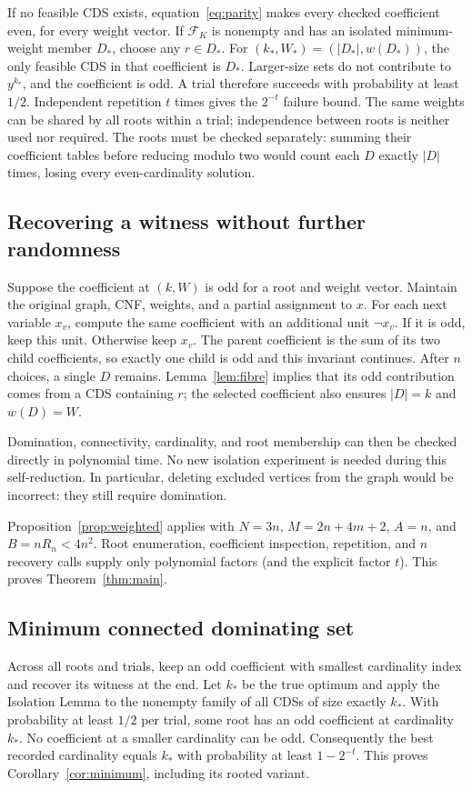 \documentclass[11pt]{article}
\theoremstyle{remark}\newtheorem{remark}[theorem]{Remark}
\begin{document}
If no feasible CDS exists, equation~\eqref{eq:parity} makes every checked
coefficient even, for every weight vector. If $\mathcal F_K$ is nonempty
and has an isolated minimum-weight member $D_*$, choose any $r\in D_*$.
For $(k_*,W_*)=(|D_*|,w(D_*))$, the only feasible CDS in that coefficient
is $D_*$. Larger-size sets do not contribute to $y^{k_*}$, and the
coefficient is odd. A trial therefore succeeds with probability at least
$1/2$. Independent repetition $t$ times gives the $2^{-t}$ failure bound.
The same weights can be shared by all roots within a trial; independence
between roots is neither used nor required.
The roots must be checked separately: summing their coefficient tables
before reducing modulo two would count each $D$ exactly $|D|$ times,
losing every even-cardinality solution.

\subsection{Recovering a witness without further randomness}
Suppose the coefficient at $(k,W)$ is odd for a root and weight vector.
Maintain the original graph, CNF, weights, and a partial assignment to
$x$. For each next variable $x_v$, compute the same coefficient with an
additional unit $\neg x_v$. If it is odd, keep this unit. Otherwise keep
$x_v$. The parent coefficient is the sum of its two child coefficients,
so exactly one child is odd and this invariant continues. After $n$
choices, a single $D$ remains. Lemma~\ref{lem:fibre} implies that its
odd contribution comes from a CDS containing $r$; the selected
coefficient also ensures $|D|=k$ and $w(D)=W$.

Domination, connectivity, cardinality, and root membership can then be
checked directly in polynomial time. No new isolation experiment is
needed during this self-reduction. In particular, deleting excluded
vertices from the graph would be incorrect: they still require domination.

Proposition~\ref{prop:weighted} applies with $N=3n$, $M=2n+4m+2$,
$A=n$, and $B=nR_n<4n^2$. Root enumeration, coefficient inspection,
repetition, and $n$ recovery calls supply only polynomial factors (and
the explicit factor $t$). This proves Theorem~\ref{thm:main}.

\subsection{Minimum connected dominating set}
Across all roots and trials, keep an odd coefficient with smallest
cardinality index and recover its witness at the end. Let $k_*$ be the
true optimum and apply the Isolation Lemma to the nonempty family of
all CDSs of size exactly $k_*$. With probability at least $1/2$ per
trial, some root has an odd coefficient at cardinality $k_*$. No
coefficient at a smaller cardinality can be odd. Consequently the best
recorded cardinality equals $k_*$ with probability at least $1-2^{-t}$.
This proves Corollary~\ref{cor:minimum}, including its rooted variant.
\end{document}
